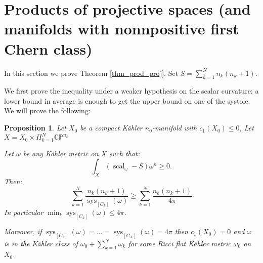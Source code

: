 \documentclass{amsart}
\newtheorem{proposition}[theorem]{Proposition}
\numberwithin{equation}{section}
\theoremstyle{definition}
\DeclareMathOperator{\scal}{scal}
\DeclareMathOperator{\sys}{sys}
\begin{document}
\section{Products of projective spaces (and manifolds with nonnpositive first Chern class)}

In this section we prove Theorem \ref{thm_prod_proj}.
Set $S=\sum_{k=1}^N n_k(n_k+1)$.

We first prove the inequality under a weaker hypothesis on the scalar curvature: a lower bound in average is enough to get the upper bound on one of the systole. We will prove the following:
\begin{proposition}
\label{thm_prod_proj_avg}
Let $X_0$ be a compact K\"ahler $n_0$-manifold with $c_1(X_0)\leq 0$, %
Let $X=X_0\times\Pi_{k=1}^N\mathbb{CP}^{n_k}$ %

Let $\omega$ be any K\"ahler metric on $X$ such that:
\[\int_X(\scal_\omega-S)\omega^n\geq 0.\]
Then:
\[\sum_{k=1}^N\frac{n_k(n_k+1)}{\sys_{[C_k]}(\omega)}\geq \sum_{k=1}^N \frac{n_k(n_k+1)}{4\pi}\]
In particular $\min_k \sys_{[C_k]}(\omega) \leq 4\pi$.

Moreover, if $\sys_{[C_1]}(\omega)=\dots= \sys_{[C_N]}(\omega)=4\pi$ then $c_1(X_0)=0$ and $\omega$ is in the K\"ahler class of $\omega_0+\sum_{k=1}^N\omega_k$ for some Ricci flat K\"ahler metric $\omega_0$ on $X_0$.
\end{proposition}
\end{document}
